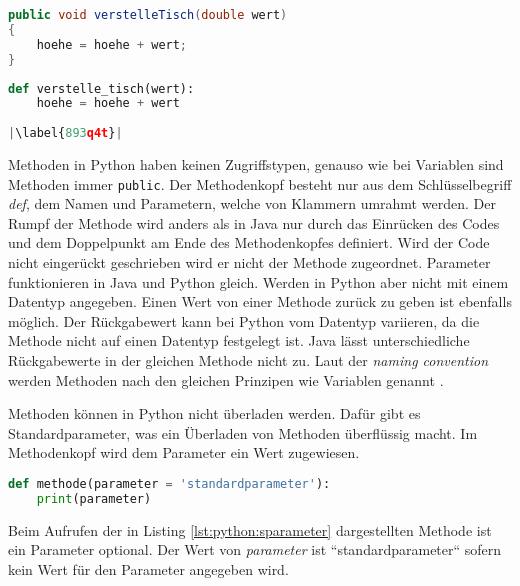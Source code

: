 \begin{minipage}{.5\linewidth}
\begin{lstlisting}[language=java,caption={Methoden in Java},captionpos=b,label={lst:java:methode},frame=none]
public void verstelleTisch(double wert)
{
    hoehe = hoehe + wert;
}
\end{lstlisting}
\end{minipage}
\begin{minipage}{.5\linewidth}
\begin{lstlisting}[language=python,caption={Methode in Python},captionpos=b,label={lst:python:methode},frame=l,escapechar=|]
def verstelle_tisch(wert):
    hoehe = hoehe + wert
    
|\label{893q4t}|
\end{lstlisting}
\end{minipage}

Methoden in Python haben keinen Zugriffstypen, genauso wie bei Variablen sind Methoden immer \texttt{public}. Der Methodenkopf besteht nur aus dem Schlüsselbegriff \textit{def}, dem Namen und Parametern, welche von Klammern umrahmt werden. Der Rumpf der Methode wird anders als in Java nur durch das Einrücken des Codes und dem Doppelpunkt am Ende des Methodenkopfes definiert. Wird der Code nicht eingerückt geschrieben wird er nicht der Methode zugeordnet. Parameter funktionieren in Java und Python gleich. Werden in Python aber nicht mit einem Datentyp angegeben. Einen Wert von einer Methode zurück zu geben ist ebenfalls möglich. Der Rückgabewert kann bei Python vom Datentyp variieren, da die Methode nicht auf einen Datentyp festgelegt ist. Java lässt unterschiedliche Rückgabewerte in der gleichen Methode nicht zu. Laut der \textit{naming convention} werden Methoden nach den gleichen Prinzipen wie Variablen genannt \cite{Microsoft:CapCon}\cite{Ims:h-s}. \cite{Louis:2010}\cite{Python3:Buch}
\par
Methoden können in Python nicht überladen werden. Dafür gibt es Standardparameter, was ein Überladen von Methoden überflüssig macht. Im Methodenkopf wird dem Parameter ein Wert zugewiesen.

\begin{lstlisting}[language=python,caption={Methode in Python mit Standartparameter},captionpos=b,label={lst:python:sparameter},frame=none]
def methode(parameter = 'standardparameter'):
    print(parameter)
\end{lstlisting}

Beim Aufrufen der in Listing \ref{lst:python:sparameter} dargestellten Methode ist ein Parameter optional. Der Wert von \textit{parameter} ist “standardparameter“ sofern kein Wert für den Parameter angegeben wird.\par
